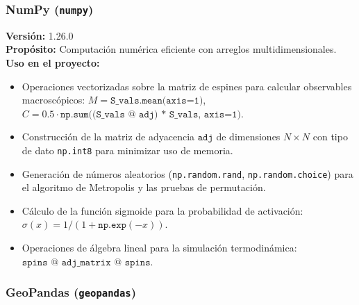 \documentclass[12pt,a4paper]{article}
\begin{document}
\subsubsection{NumPy (\texttt{numpy})}

\textbf{Versión:} 1.26.0\\
\textbf{Propósito:} Computación numérica eficiente con arreglos multidimensionales.\\
\textbf{Uso en el proyecto:}
\begin{itemize}
    \item Operaciones vectorizadas sobre la matriz de espines para calcular observables macroscópicos: $M = \texttt{S\_vals.mean(axis=1)}$, $C = 0.5 \cdot \texttt{np.sum((S\_vals @ adj) * S\_vals, axis=1)}$.
    \item Construcción de la matriz de adyacencia $\texttt{adj}$ de dimensiones $N \times N$ con tipo de dato \texttt{np.int8} para minimizar uso de memoria.
    \item Generación de números aleatorios (\texttt{np.random.rand}, \texttt{np.random.choice}) para el algoritmo de Metropolis y las pruebas de permutación.
    \item Cálculo de la función sigmoide para la probabilidad de activación: $\sigma(x) = 1/(1 + \texttt{np.exp}(-x))$.
    \item Operaciones de álgebra lineal para la simulación termodinámica: $\texttt{spins @ adj\_matrix @ spins}$.
\end{itemize}

\subsubsection{GeoPandas (\texttt{geopandas})}
\end{document}
